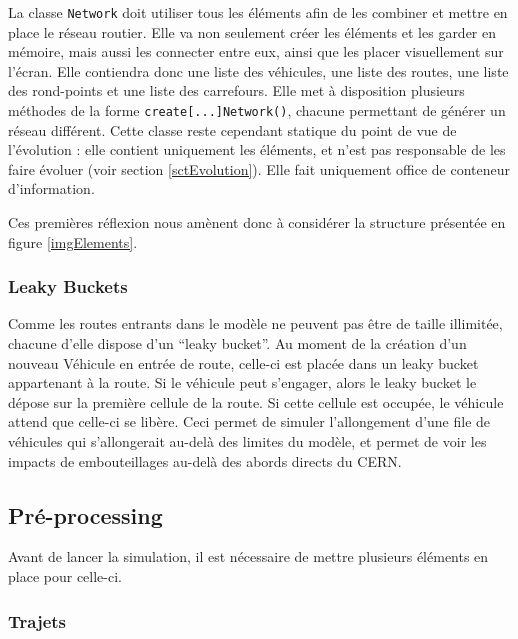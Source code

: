 \documentclass[a4paper,11pt, titlepage]{extarticle}
\begin{document}
La classe \texttt{Network} doit utiliser tous les éléments afin de les combiner et mettre en place le réseau routier. Elle va non seulement créer les éléments et les garder en mémoire, mais aussi les connecter entre eux, ainsi que les placer visuellement sur l'écran. Elle contiendra donc une liste des véhicules, une liste des routes, une liste des rond-points et une liste des carrefours. Elle met à disposition plusieurs méthodes de la forme \texttt{create[...]Network()}, chacune permettant de générer un réseau différent. Cette classe reste cependant statique du point de vue de l'évolution : elle contient uniquement les éléments, et n'est pas responsable de les faire évoluer (voir section \ref{sctEvolution}). Elle fait uniquement office de conteneur d'information.

Ces premières réflexion nous amènent donc à considérer la structure présentée en figure \ref{imgElements}.

\subsubsection{Leaky Buckets}

Comme les routes entrants dans le modèle ne peuvent pas être de taille illimitée, chacune d'elle dispose d'un ``leaky bucket''. Au moment de la création d'un nouveau Véhicule en entrée de route, celle-ci est placée dans un leaky bucket appartenant à la route. Si le véhicule peut s'engager, alors le leaky bucket le dépose sur la première cellule de la route. Si cette cellule est occupée, le véhicule attend que celle-ci se libère. Ceci permet de simuler l'allongement d'une file de véhicules qui s'allongerait au-delà des limites du modèle, et permet de voir les impacts de embouteillages au-delà des abords directs du CERN.

\newpage

\subsection{Pré-processing}

Avant de lancer la simulation, il est nécessaire de mettre plusieurs éléments en place pour celle-ci.

\subsubsection{Trajets}
\end{document}
